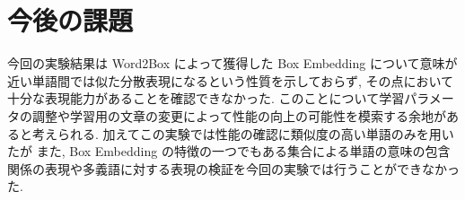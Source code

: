 \documentclass[twocolumn]{jarticle}     %
\begin{document}
\section{今後の課題}
今回の実験結果は Word2Box によって獲得した Box Embedding について意味が近い単語間では似た分散表現になるという性質を示しておらず, その点において十分な表現能力があることを確認できなかった. 
このことについて学習パラメータの調整や学習用の文章の変更によって性能の向上の可能性を模索する余地があると考えられる. 
加えてこの実験では性能の確認に類似度の高い単語のみを用いたが
また, Box Embedding の特徴の一つでもある集合による単語の意味の包含関係の表現や多義語に対する表現の検証を今回の実験では行うことができなかった. 

\end{document}
